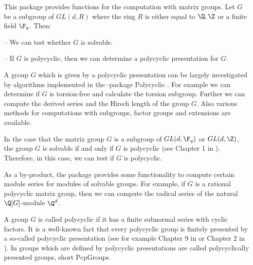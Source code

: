 


This package provides functions for the computation with matrix
groups. Let $G$ be a subgroup of $GL(d,R)$ where the ring $R$ is
either equal to $\Q,\Z$ or a finite field $\F_q$.
Then: 
\beginlist
\item{--} 
    We can test whether $G$ is solvable.
\item{--}
    If $G$ is polycyclic, then we can determine a polycyclic
    presentation for $G$. 
\endlist

A group $G$ which is given by a polycyclic presentation can be largely
investigated by algorithms implemented in the {\GAP}-package
Polycyclic \cite{polycyclic}. For example 
we can determine if $G$ is torsion-free
and calculate the torsion subgroup. Further we can compute the derived
series and the Hirsch length of the group $G$. Also various methods for
computations with subgroups, factor groups and extensions are
available.

In the case that the matrix group 
$G$ is a subgroup of $GL(d,\F_q)$ or $GL(d,\Z)$, the
group $G$ is solvable if and only if $G$ is polycyclic (see Chapter 1
in \cite{Segal}). 
Therefore, in this case, we can test if $G$ is polycyclic. 

As a by-product, the {\Polenta} package 
provides some functionality to compute certain module series for
modules of solvable groups. For example, if
$G$ is a rational polycyclic matrix group, then we can compute the 
radical series of the natural
$\Q[G]$-module $\Q^d$.  


A group $G$ is called polycyclic if it has a finite subnormal
series with cyclic 
factors. It is a well-known fact that every polycyclic group is
finitely presented by a so-called polycyclic presentation (see
for example Chapter 9 in \cite{Sims} or Chapter 2 in \cite{polycyclic} ). 
In {\GAP} groups which are defined by polycyclic
 presentations are called
polycyclically presented groups, short PcpGroups.
 
